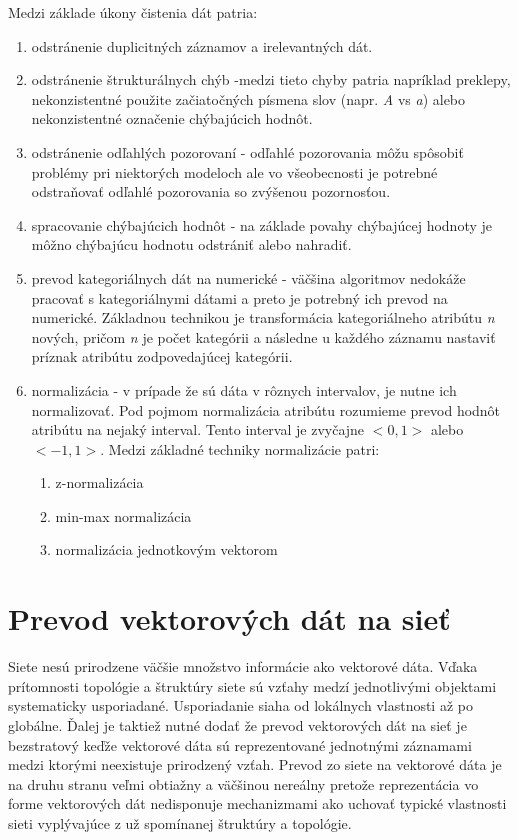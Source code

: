 \documentclass[slovak,master,dept460,male,cpp,cpdeclaration]{diploma}
\begin{document}
Medzi základe úkony čistenia dát patria:
\begin{enumerate}
\item  odstránenie duplicitných záznamov a irelevantných dát.
\item odstránenie štrukturálnych chýb -medzi tieto chyby patria napríklad preklepy, nekonzistentné použite začiatočných písmena slov (napr. \textit{A} vs \textit{a}) alebo nekonzistentné označenie chýbajúcich hodnôt.
\item odstránenie odľahlých pozorovaní - odľahlé pozorovania môžu spôsobiť problémy pri niektorých modeloch ale vo všeobecnosti je potrebné odstraňovať odľahlé pozorovania so zvýšenou pozornosťou.
\item spracovanie chýbajúcich hodnôt - na základe povahy chýbajúcej hodnoty je môžno chýbajúcu hodnotu odstrániť alebo nahradiť. 
\item prevod kategoriálnych dát na numerické - väčšina algoritmov nedokáže pracovať s kategoriálnymi dátami a preto je potrebný ich prevod na numerické. Základnou technikou je transformácia kategoriálneho atribútu \textit{n} nových, pričom \textit{n} je počet kategórii a následne u každého záznamu nastaviť príznak atribútu zodpovedajúcej kategórii.
\item normalizácia - v prípade že sú dáta v rôznych intervalov, je nutne ich normalizovať. Pod pojmom normalizácia atribútu rozumieme prevod hodnôt atribútu na nejaký interval. Tento interval je zvyčajne $<0,1>$ alebo $<-1,1>$. Medzi základné techniky normalizácie patri:
\begin{enumerate}
\item z-normalizácia
\item min-max normalizácia
\item normalizácia jednotkovým vektorom
\end{enumerate}
\end{enumerate}

\section{Prevod vektorových dát na sieť}\label{sec:vector_to_network}
Siete nesú prirodzene väčšie množstvo informácie ako vektorové dáta. Vďaka prítomnosti topológie a štruktúry siete sú vzťahy medzí jednotlivými objektami systematicky usporiadané. Usporiadanie siaha od lokálnych vlastnosti až po globálne.
Ďalej je taktiež nutné dodať že prevod vektorových dát na sieť je bezstratový keďže vektorové dáta sú reprezentované jednotnými záznamami medzi ktorými neexistuje prirodzený vzťah. Prevod zo siete na vektorové dáta je na druhu stranu veľmi obtiažny a väčšinou nereálny pretože reprezentácia vo forme vektorových dát nedisponuje mechanizmami ako uchovať typické vlastnosti sieti vyplývajúce z už spomínanej štruktúry a topológie.
\end{document}
